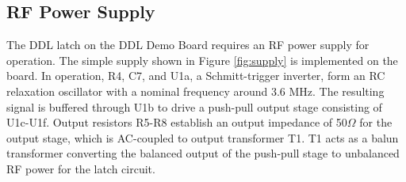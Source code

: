\documentclass{article}
\begin{document}
\begin{multicols}{2}
\subsection*{RF Power Supply}
\noindent The DDL latch on the DDL Demo Board requires an RF power
supply for operation.  The simple supply shown in Figure
\ref{fig:supply} is implemented on the board.  In operation, R4, C7,
and U1a, a Schmitt-trigger inverter, form an RC relaxation oscillator
with a nominal frequency around 3.6 MHz.  The resulting signal is
buffered through U1b to drive a push-pull output stage consisting of
U1c-U1f.  Output resistors R5-R8 establish an output impedance of
50$\Omega$ for the output stage, which is AC-coupled to output
transformer T1.  T1 acts as a balun transformer converting the
balanced output of the push-pull stage to unbalanced RF power for the
latch circuit.

\end{multicols}
\end{document}
